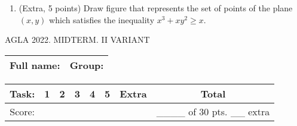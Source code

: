 \documentclass[]{exam}
\begin{document}
\begin{enumerate}



\item (Extra, 5 points) Draw figure that represents the set of points of the plane $(x,y)$ which satisfies the inequality $x^3+xy^2 \ge x$.


\end{enumerate}




\newpage 


AGLA 2022. MIDTERM. II VARIANT
\bigskip
\large

\begin{tabular}[b]{p{10cm}|p{2cm}}
    Full name: & Group: \\ \hline
\end{tabular}
\bigskip

\begin{tabular}[b]{|c|c|c|c|c|c|c|c|}
    \hline
    Task: & 1 & 2 & 3 & 4 & 5 & Extra & Total \\ \hline
    Score: &  &  &  &  &  & & \_\_\_\_ of 30 pts. \_\_ extra \\ \hline
\end{tabular}
\end{document}
